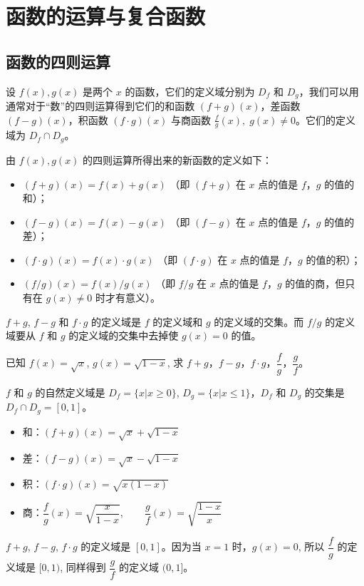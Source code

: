 \section{函数的运算与复合函数}

\subsection{函数的四则运算}

设 $f(x),g(x)$ 是两个 $x$ 的函数，它们的定义域分别为 $D_f$ 和 $D_g$，我们可以用通常对于“数”的四则运算得到它们的和函数 $(f+g)(x)$，差函数 $(f-g)(x)$，积函数 $(f\cdot g)(x)$ 与商函数 $\frac{f}{g}(x),\; g(x)\ne 0$。它们的定义域为 $D_f\cap D_g$。

由 $f(x),g(x)$ 的四则运算所得出来的新函数的定义如下：
\begin{itemize}[itemsep=7pt]
  \item $(f+g)(x)=f(x)+g(x)$ （即 $(f+g)$ 在 $x$ 点的值是 $f$，$g$ 的值的和）；
  \item $(f-g)(x)=f(x)-g(x)$ （即 $(f-g)$ 在 $x$ 点的值是 $f$，$g$ 的值的差）；
  \item $(f\cdot g)(x)=f(x)\cdot g(x)$ （即 $(f\cdot g)$ 在 $x$ 点的值是 $f$，$g$ 的值的积）；
  \item $(f/g)(x)=f(x)/g(x)$ （即 $f/g$ 在 $x$ 点的值是 $f$，$g$ 的值的商，但只有在 $g(x)\ne 0$ 时才有意义）。
\end{itemize}

$f+g$, $f-g$ 和 $f\cdot g$ 的定义域是 $f$ 的定义域和 $g$ 的定义域的交集。而 $f/g$ 的定义域要从 $f$ 和 $g$ 的定义域的交集中去掉使 $g(x)=0$ 的值。

\begin{example}
  已知 $f(x)=\sqrt{x}$, $g(x)=\sqrt{1-x}$, 求 $f+g$，$f-g$，$f\cdot g$，$\dfrac{f}{g}$，$\dfrac{g}{f}$。
\end{example}

\begin{solution}
    $f$ 和 $g$ 的自然定义域是 $D_f=\{x|x\geqslant 0\}$, $D_g=\{x|x\leqslant 1\}$，$D_f$ 和 $D_g$ 的交集是 $D_f\cap D_g=[0,1]$。
\begin{itemize}[itemsep=7pt]
    \item 和：$(f+g)(x)=\sqrt{x}+\sqrt{1-x}$
    \item 差：$(f-g)(x)=\sqrt{x}-\sqrt{1-x}$
    \item 积：$(f\cdot g)(x)=\sqrt{x(1-x)}$
    \item 商：$\dfrac{f}{g}(x)=\sqrt{\dfrac{x}{1-x}},\qquad \dfrac{g}{f}(x)=\sqrt{\dfrac{1-x}{x}}$
\end{itemize}

$f+g$, $f-g$, $f\cdot g$ 的定义域是 $[0,1]$。因为当 $x=1$ 时，$g(x)=0$, 所以 $\dfrac{f}{g}$ 的定义域是 $[0,1)$, 同样得到 $\dfrac{g}{f}$ 的定义域 $(0,1]$。
\end{solution}

